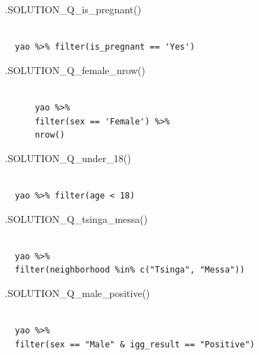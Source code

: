 \documentclass[
  letterpaper,
  DIV=11,
  numbers=noendperiod]{scrreprt}
\newenvironment{Shaded}{\begin{snugshade}}{\end{snugshade}}
\newcommand{\FunctionTok}[1]{\textcolor[rgb]{0.28,0.35,0.67}{#1}}
\newcommand{\NormalTok}[1]{\textcolor[rgb]{0.00,0.23,0.31}{#1}}
\begin{document}
\begin{Shaded}
\begin{Highlighting}[]
\FunctionTok{.SOLUTION\_Q\_is\_pregnant}\NormalTok{()}
\end{Highlighting}
\end{Shaded}

\begin{verbatim}
 
  yao %>% filter(is_pregnant == 'Yes')
\end{verbatim}

\begin{Shaded}
\begin{Highlighting}[]
\FunctionTok{.SOLUTION\_Q\_female\_nrow}\NormalTok{()}
\end{Highlighting}
\end{Shaded}

\begin{verbatim}
 
      yao %>%
      filter(sex == 'Female') %>%
      nrow()
\end{verbatim}

\begin{Shaded}
\begin{Highlighting}[]
\FunctionTok{.SOLUTION\_Q\_under\_18}\NormalTok{()}
\end{Highlighting}
\end{Shaded}

\begin{verbatim}
 
  yao %>% filter(age < 18)
\end{verbatim}

\begin{Shaded}
\begin{Highlighting}[]
\FunctionTok{.SOLUTION\_Q\_tsinga\_messa}\NormalTok{()}
\end{Highlighting}
\end{Shaded}

\begin{verbatim}
 
  yao %>%
  filter(neighborhood %in% c("Tsinga", "Messa"))
\end{verbatim}

\begin{Shaded}
\begin{Highlighting}[]
\FunctionTok{.SOLUTION\_Q\_male\_positive}\NormalTok{()}
\end{Highlighting}
\end{Shaded}

\begin{verbatim}
 
  yao %>%
  filter(sex == "Male" & igg_result == "Positive")
\end{verbatim}
\end{document}
